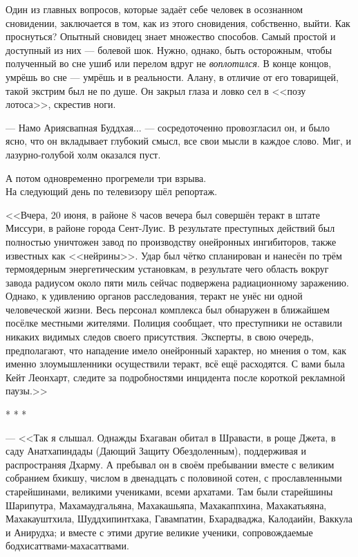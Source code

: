 \documentclass[openany, oneside]{book}
\begin{document}
Один из главных вопросов, которые задаёт себе человек в осознанном сновидении, заключается в том, как из этого сновидения, собственно, выйти. Как проснуться? Опытный сновидец знает множество способов. Самый простой и доступный из них --- болевой шок. Нужно, однако, быть осторожным, чтобы полученный во сне ушиб или перелом вдруг не \textit{воплотился}. В конце концов, умрёшь во сне --- умрёшь и в реальности. Алану, в отличие от его товарищей, такой экстрим был не по душе. Он закрыл глаза и ловко сел в <<позу лотоса>>, скрестив ноги.

--- Намо Ариясвапная Буддхая... --- сосредоточенно провозгласил он, и было ясно, что он вкладывает глубокий смысл, все свои мысли в каждое слово. Миг, и лазурно-голубой холм оказался пуст.

А потом одновременно прогремели три взрыва.\\

На следующий день по телевизору шёл репортаж.

<<Вчера, 20 июня, в районе 8 часов вечера был совершён теракт в штате Миссури, в районе города Сент-Луис. В результате преступных действий был полностью уничтожен завод по производству онейронных ингибиторов, также известных как <<нейрины>>. Удар был чётко спланирован и нанесён по трём термоядерным энергетическим установкам, в результате чего область вокруг завода радиусом около пяти миль сейчас подвержена радиационному заражению. Однако, к удивлению органов расследования, теракт не унёс ни одной человеческой жизни. Весь персонал комплекса был обнаружен в ближайшем посёлке местными жителями. Полиция сообщает, что преступники не оставили никаких видимых следов своего присутствия. Эксперты, в свою очередь, предполагают, что нападение имело онейронный характер, но мнения о том, как именно злоумышленники осуществили теракт, всё ещё расходятся. С вами была Кейт Леонхарт, следите за подробностями инцидента после короткой рекламной паузы.>>

\begin{center}
    * * *
\end{center}

--- <<Так я слышал. Однажды Бхагаван обитал в Шравасти, в роще Джета, в саду Анатхапиндады (Дающий Защиту Обездоленным), поддерживая и распространяя Дхарму. А пребывал он в своём пребывании вместе с великим собранием бхикшу, числом в двенадцать с половиной сотен, с прославленными старейшинами, великими учениками, всеми архатами. Там были старейшины Шарипутра, Махамаудгальяна, Махакашьяпа, Махакаппхина, Махакатьяяна, Махакауштхила, Шуддхипинтхака, Гавампатин, Бхарадваджа, Калодаийн, Ваккула и Анирудха; и вместе с этими другие великие ученики, сопровождаемые бодхисаттвами-махасаттвами.
\end{document}
